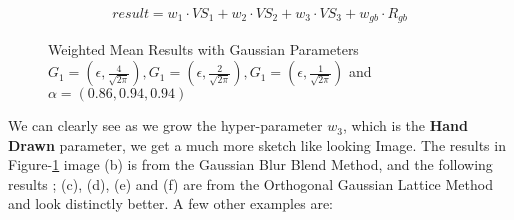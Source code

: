 \documentclass{article}
\begin{document}
\begin{align*}
    result = w_1 \cdot {VS}_1 + w_2 \cdot {VS}_2 + w_3 \cdot {VS}_3 + w_{gb} \cdot R_{gb} 
\end{align*}

\begin{figure}[ht]
    \centering
    \qquad
    \qquad
    \qquad
    \qquad
    \qquad
    \caption{\centering Weighted Mean Results with Gaussian Parameters $G_1=(\epsilon, \frac{4}{\sqrt{2 \pi}}), G_1=(\epsilon, \frac{2}{\sqrt{2 \pi}}), G_1=(\epsilon, \frac{1}{\sqrt{2 \pi}})$ and $\alpha=(0.86, 0.94, 0.94)$ \label{fig:lenna-result-(4, 2, 1)-(0.86, 0.94 0.94)}}
\end{figure}

We can clearly see as we grow the hyper-parameter $w_3$, which is the \textbf{Hand Drawn} parameter, we get a much more sketch like looking Image. The results in Figure-\ref{fig:lenna-result-(4, 2, 1)-(0.86, 0.94 0.94)} image (b) is from the Gaussian Blur Blend Method, and the following results ; (c), (d), (e) and (f) are from the Orthogonal Gaussian Lattice Method and look distinctly better. A few other examples are:
\end{document}
